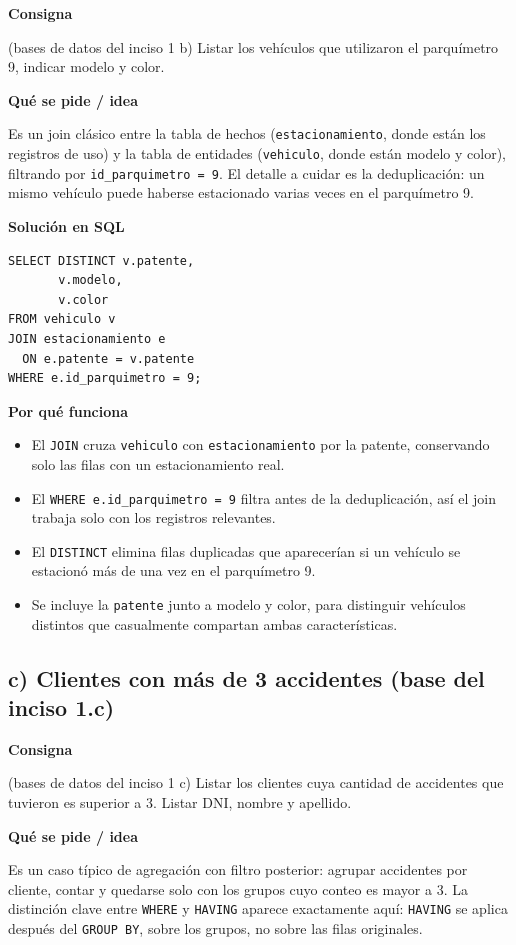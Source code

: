 \documentclass[11pt,a4paper]{article}
\newcommand{\itemcabecera}[1]{\noindent\textbf{#1}\par\medskip}
\newcommand{\bloqueConsigna}{\itemcabecera{Consigna}}
\newcommand{\bloqueIdea}{\itemcabecera{Qu\'e se pide / idea}}
\newcommand{\bloqueSolucion}{\itemcabecera{Soluci\'on en SQL}}
\newcommand{\bloquePorque}{\itemcabecera{Por qu\'e funciona}}
\begin{document}
\bloqueConsigna

(bases de datos del inciso 1 b) Listar los vehículos que utilizaron el parquímetro 9, indicar modelo y color.

\bloqueIdea

Es un join clásico entre la tabla de hechos (\texttt{estacionamiento}, donde están los registros de uso) y la tabla de entidades (\texttt{vehiculo}, donde están modelo y color), filtrando por \texttt{id\_parquimetro = 9}. El detalle a cuidar es la deduplicación: un mismo vehículo puede haberse estacionado varias veces en el parquímetro 9.

\bloqueSolucion

\begin{lstlisting}
SELECT DISTINCT v.patente,
       v.modelo,
       v.color
FROM vehiculo v
JOIN estacionamiento e
  ON e.patente = v.patente
WHERE e.id_parquimetro = 9;
\end{lstlisting}

\bloquePorque

\begin{itemize}
    \item El \texttt{JOIN} cruza \texttt{vehiculo} con \texttt{estacionamiento} por la patente, conservando solo las filas con un estacionamiento real.
    \item El \texttt{WHERE e.id\_parquimetro = 9} filtra antes de la deduplicación, así el join trabaja solo con los registros relevantes.
    \item El \texttt{DISTINCT} elimina filas duplicadas que aparecerían si un vehículo se estacionó más de una vez en el parquímetro 9.
    \item Se incluye la \texttt{patente} junto a modelo y color, para distinguir vehículos distintos que casualmente compartan ambas características.
\end{itemize}

\subsection{c) Clientes con más de 3 accidentes (base del inciso 1.c)}

\bloqueConsigna

(bases de datos del inciso 1 c) Listar los clientes cuya cantidad de accidentes que tuvieron es superior a 3. Listar DNI, nombre y apellido.

\bloqueIdea

Es un caso típico de agregación con filtro posterior: agrupar accidentes por cliente, contar y quedarse solo con los grupos cuyo conteo es mayor a 3. La distinción clave entre \texttt{WHERE} y \texttt{HAVING} aparece exactamente aquí: \texttt{HAVING} se aplica después del \texttt{GROUP BY}, sobre los grupos, no sobre las filas originales.
\end{document}

